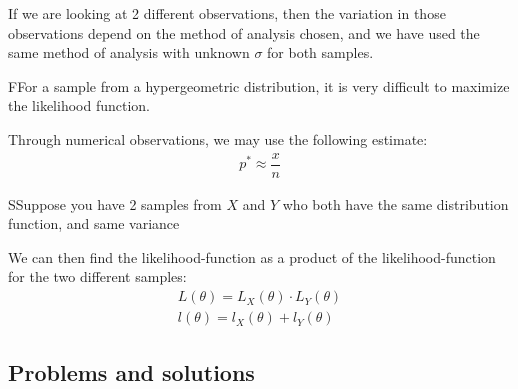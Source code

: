 \noindent If we are looking at 2 different observations, then the variation in those observations depend on the method of analysis chosen, and we have used the same method of analysis with unknown $\sigma$ for both samples.  
\par\bigskip
\begin{lem}
  FFor a sample from a hypergeometric distribution, it is very difficult to maximize the likelihood function.\par
  \noindent Through numerical observations, we may use the following estimate:
  \begin{equation*}
    \begin{gathered}
      p^*\approx \dfrac{x}{n}
    \end{gathered}
  \end{equation*}
\end{lem}
\par\bigskip
\begin{lem}
  SSuppose you have 2 samples from $X$ and $Y$ who both have the same distribution function, and same variance\par
  \noindent We can then find the likelihood-function as a product of the likelihood-function for the two different samples:
  \begin{equation*}
    \begin{gathered}
      L(\theta) = L_X(\theta)\cdot L_Y(\theta)\\
      l(\theta) = l_X(\theta)+l_Y(\theta)
    \end{gathered}
  \end{equation*}
\end{lem}
\par\bigskip
\subsection{Problems and solutions}\hfill\\\par
